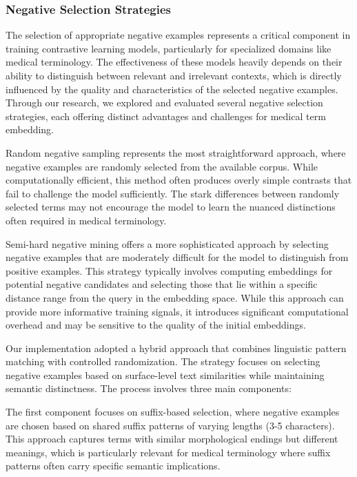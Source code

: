 \subsubsection{Negative Selection Strategies}
\label{subsubsec:negative_selection}

The selection of appropriate negative examples represents a critical component in training contrastive learning models, particularly for specialized domains like medical terminology. The effectiveness of these models heavily depends on their ability to distinguish between relevant and irrelevant contexts, which is directly influenced by the quality and characteristics of the selected negative examples. Through our research, we explored and evaluated several negative selection strategies, each offering distinct advantages and challenges for medical term embedding.

Random negative sampling represents the most straightforward approach, where negative examples are randomly selected from the available corpus. While computationally efficient, this method often produces overly simple contrasts that fail to challenge the model sufficiently. The stark differences between randomly selected terms may not encourage the model to learn the nuanced distinctions often required in medical terminology.

Semi-hard negative mining offers a more sophisticated approach by selecting negative examples that are moderately difficult for the model to distinguish from positive examples. This strategy typically involves computing embeddings for potential negative candidates and selecting those that lie within a specific distance range from the query in the embedding space. While this approach can provide more informative training signals, it introduces significant computational overhead and may be sensitive to the quality of the initial embeddings.

Our implementation adopted a hybrid approach that combines linguistic pattern matching with controlled randomization. The strategy focuses on selecting negative examples based on surface-level text similarities while maintaining semantic distinctness. The process involves three main components:

The first component focuses on suffix-based selection, where negative examples are chosen based on shared suffix patterns of varying lengths (3-5 characters). This approach captures terms with similar morphological endings but different meanings, which is particularly relevant for medical terminology where suffix patterns often carry specific semantic implications.

